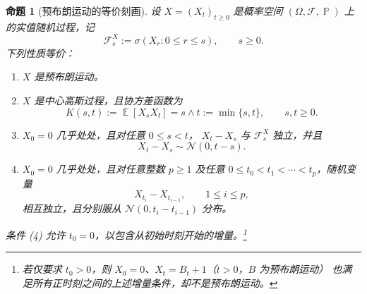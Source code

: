 \documentclass[UTF8,11pt,a4paper,oneside,fontset=fandol]{ctexrep}
\numberwithin{equation}{section}
\theoremstyle{plain}
\newtheorem{proposition}[theorem]{命题}
\theoremstyle{definition}
\theoremstyle{remark}
\newcommand{\F}{\mathcal{F}}
\DeclareMathOperator{\Prob}{\mathbb{P}}
\DeclareMathOperator{\E}{\mathbb{E}}
\begin{document}
\begin{proposition}[预布朗运动的等价刻画]
\label{prop:pre-brownian-equivalences}
设 $X=(X_t)_{t\ge0}$ 是概率空间 $(\Omega,\F,\Prob)$ 上的实值随机过程，记
\[
  \F_s^X:=\sigma(X_r:0\le r\le s),\qquad s\ge0.
\]
下列性质等价：
\begin{enumerate}[label=(\arabic*)]
  \item $X$ 是预布朗运动。
  \item $X$ 是中心高斯过程，且协方差函数为
    \[
      K(s,t):=\E[X_sX_t]=s\wedge t:=\min\{s,t\},\qquad s,t\ge0.
    \]
  \item $X_0=0$ 几乎处处，且对任意 $0\le s<t$，
    $X_t-X_s$ 与 $\F_s^X$ 独立，并且
    \[
      X_t-X_s\sim\mathcal{N}(0,t-s).
    \]
  \item $X_0=0$ 几乎处处，且对任意整数 $p\ge1$ 及任意
    $0\le t_0<t_1<\cdots<t_p$，随机变量
    \[
      X_{t_i}-X_{t_{i-1}},\qquad 1\le i\le p,
    \]
    相互独立，且分别服从 $\mathcal{N}(0,t_i-t_{i-1})$ 分布。
\end{enumerate}
条件 (4) 允许 $t_0=0$，以包含从初始时刻开始的增量。\footnote{%
若仅要求 $t_0>0$，则 $X_0=0$、$X_t=B_t+1$（$t>0$，$B$ 为预布朗运动）
也满足所有正时刻之间的上述增量条件，却不是预布朗运动。}
\end{proposition}
\end{document}
